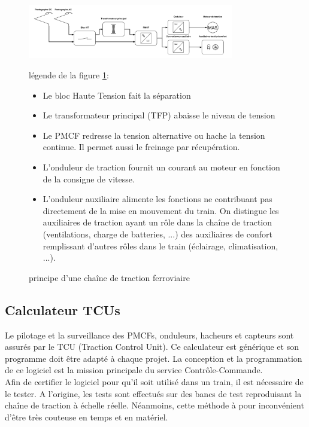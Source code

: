 \documentclass[a4paper]{report}
\begin{document}
		\begin{figure}[h]	
		\begin{center}			
		\includegraphics[width=0.8\textwidth]{chaine_traction}
		\caption{principe d'une chaîne de traction ferroviaire}
		\label{schema:traction}				
		\end{center}
		légende de la figure \ref{schema:traction}:
		\begin{itemize}
	\item Le bloc Haute Tension fait la séparation
	\item Le transformateur principal (TFP) abaisse le niveau de tension
	\item Le PMCF redresse la tension alternative ou hache la tension continue. Il permet aussi le freinage par récupération.
	\item L'onduleur de traction fournit un courant au moteur en fonction de la consigne de vitesse.
	\item L'onduleur auxiliaire alimente les fonctions ne contribuant pas directement de la mise en mouvement du train. On distingue les auxiliaires de traction ayant un rôle dans la chaîne de traction (ventilations, charge de batteries, ...) des auxiliaires de confort remplissant d'autres rôles dans le train (éclairage, climatisation, ...).
\end{itemize}
		\end{figure}



\subsection{Calculateur TCUs}	
	Le pilotage et la surveillance des PMCFs, onduleurs, hacheurs et capteurs sont assurés par le TCU (Traction Control Unit). Ce calculateur est générique et son programme doit être adapté à chaque projet. La conception et la programmation de ce logiciel est la mission principale du service Contrôle-Commande.\\
	Afin de certifier le logiciel pour qu'il soit utilisé dans un train, il est nécessaire de le tester. A l'origine, les tests sont effectués sur des bancs de test reproduisant la chaîne de traction à échelle réelle. Néanmoins, cette méthode à pour inconvénient d'être très couteuse en temps et en matériel.
\end{document}
